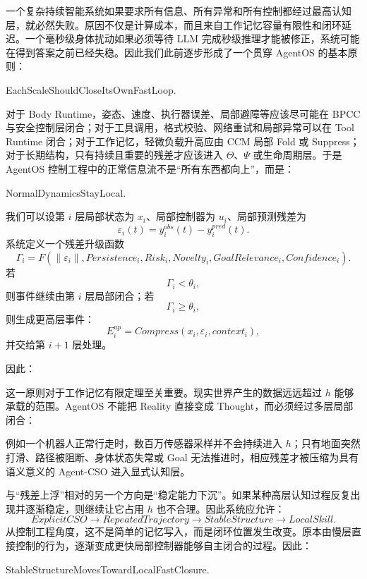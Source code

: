 一个复杂持续智能系统如果要求所有信息、所有异常和所有控制都经过最高认知层，就必然失败。原因不仅是计算成本，而且来自工作记忆容量有限性和闭环延迟。一个毫秒级身体扰动如果必须等待 LLM 完成秒级推理才能被修正，系统可能在得到答案之前已经失稳。因此我们此前逐步形成了一个贯穿 AgentOS 的基本原则：
\begin{statementbox}
EachScaleShouldCloseItsOwnFastLoop.
\end{statementbox}

对于 Body Runtime，姿态、速度、执行器误差、局部避障等应该尽可能在 BPCC 与安全控制层闭合；对于工具调用，格式校验、网络重试和局部异常可以在 Tool Runtime 闭合；对于工作记忆，轻微负载升高应由 CCM 局部 Fold 或 Suppress；对于长期结构，只有持续且重要的残差才应该进入 $\Theta$、$\Psi$ 或生命周期层。于是 AgentOS 控制工程中的正常信息流不是“所有东西都向上”，而是：
\begin{statementbox}
NormalDynamicsStayLocal.
\end{statementbox}

我们可以设第 $i$ 层局部状态为 $x_i$、局部控制器为 $u_i$、局部预测残差为
\[
\varepsilon_i(t)
=
y_i^{obs}(t)
-
y_i^{pred}(t).
\]
系统定义一个残差升级函数
\[
\Gamma_i
=
F(
\|\varepsilon_i\|,
Persistence_i,
Risk_i,
Novelty_i,
GoalRelevance_i,
Confidence_i
).
\]
若
\[
\Gamma_i<\theta_i,
\]
则事件继续由第 $i$ 层局部闭合；若
\[
\Gamma_i\ge\theta_i,
\]
则生成更高层事件：
\[
E_i^{up}
=
Compress(
x_i,\varepsilon_i,context_i
),
\]
并交给第 $i+1$ 层处理。

因此：
\begin{statementbox}
\centering
{}
\end{statementbox}

这一原则对于工作记忆有限定理至关重要。现实世界产生的数据远远超过 $h$ 能够承载的范围。AgentOS 不能把 Reality 直接变成 Thought，而必须经过多层局部闭合：
\begin{statementbox}
\centering
{}
\end{statementbox}
例如一个机器人正常行走时，数百万传感器采样并不会持续进入 $h$；只有地面突然打滑、路径被阻断、身体状态失常或 Goal 无法推进时，相应残差才被压缩为具有语义意义的 Agent-CSO 进入显式认知层。

与“残差上浮”相对的另一个方向是“稳定能力下沉”。如果某种高层认知过程反复出现并逐渐稳定，则继续让它占用 $h$ 也不合理。因此系统应允许：
\[
ExplicitCSO
\rightarrow
RepeatedTrajectory
\rightarrow
StableStructure
\rightarrow
LocalSkill.
\]
从控制工程角度，这不是简单的记忆写入，而是闭环位置发生改变。原本由慢层直接控制的行为，逐渐变成更快局部控制器能够自主闭合的过程。因此：
\begin{statementbox}
StableStructureMovesTowardLocalFastClosure.
\end{statementbox}

